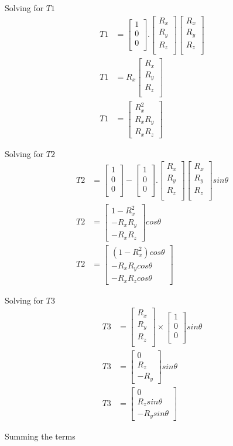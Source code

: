 \documentclass{article}
\newcommand{\xaxis}{
    \begin{bmatrix}
        1 \\
        0 \\
        0 \\
    \end{bmatrix}
}
\newcommand{\rotAxis}{
    \begin{bmatrix}
        R_x \\
        R_y \\
        R_z \\
    \end{bmatrix}
}
\newcommand{\vparallelForX}{
    \xaxis . \rotAxis 
    \rotAxis
}
\begin{document}
    Solving for $T1$
    \begin{align}
        T1 &= \vparallelForX \\
        T1 &= R_x \rotAxis \\
        T1 &= \begin{bmatrix} R_x^2 \\ R_xR_y \\ R_xR_z \end{bmatrix}
    \end{align}

    Solving for $T2$
    \begin{align}
        T2 &= \xaxis - \vparallelForX sin\theta \\
        T2 &= \begin{bmatrix} 1-R_x^2 \\ -R_xR_y \\ -R_xR_z \end{bmatrix} cos\theta \\
        T2 &= \begin{bmatrix} (1-R_x^2)cos\theta \\ -R_xR_ycos\theta \\ -R_xR_zcos\theta \end{bmatrix}
    \end{align}

    Solving for $T3$
    \begin{align}
        T3 &= \rotAxis \times \xaxis sin\theta \\
        T3 &= \begin{bmatrix} 0\\ R_z \\ -R_y \end{bmatrix}sin\theta\\
        T3 &= \begin{bmatrix} 0 \\ R_zsin\theta \\ -R_ysin\theta \end{bmatrix}
    \end{align}
    
    Summing the terms 
\end{document}
